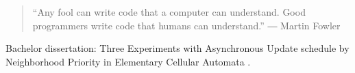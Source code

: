 
\begin{quote}
``Any fool can write code that a \newline computer can understand. Good \newline programmers write code that humans can understand.''
― Martin Fowler 
\end{quote}

%
%
%
%
%



\divider\smallskip


\smallskip

\divider

\divider

\divider


\smallskip

\divider

\divider

\divider


\medskip


Bachelor dissertation: Three Experiments with Asynchronous Update schedule by Neighborhood Priority in Elementary Cellular Automata .


\divider

